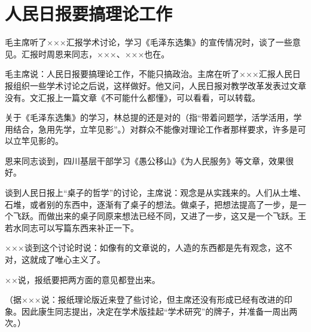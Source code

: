 \section[人民日报要搞理论工作（一九六四年三月二十二日）]{人民日报要搞理论工作}


毛主席听了×××汇报学术讨论，学习《毛泽东选集》的宣传情况时，谈了一些意见。汇报时周恩来同志，×××、×××也在。

毛主席说：人民日报要搞理论工作，不能只搞政治。主席在听了×××汇报人民日报组织一些学术讨论之后说，这样做好。他又问，人民日报对教学改革发表过文章没有。文汇报上一篇文章《不可能什么都懂》，可以看看，可以转载。

关于《毛泽东选集》的学习，林总提的还是对的（指“带着问题学，活学活用，学用结合，急用先学，立竿见影”。）对群众不能像对理论工作者那样要求，许多是可以立竿见影的。

恩来同志谈到，四川基层干部学习《愚公移山》《为人民服务》等文章，效果很好。

谈到人民日报上“桌子的哲学”的讨论，主席说：观念是从实践来的。人们从土堆、石堆，或者别的东西中，逐渐有了桌子的想法。做桌子，把想法提高了一步，是一个飞跃。而做出来的桌子同原来想法已经不同，又进了一步，这又是一个飞跃。王若水同志可以写篇东西来补正一下。

×××谈到这个讨论时说：如像有的文章说的，人造的东西都是先有观念，这不对，这就成了唯心主义了。

××说，报纸要把两方面的意见都登出来。

（据×××说：报纸理论版近来登了些讨论，但主席还没有形成已经有改进的印象。因此康生同志提出，决定在学术版挂起“学术研究”的牌子，并准备一周出两次。）

